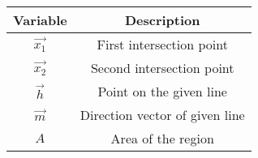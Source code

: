 \begin{tabular}[12pt]{ |c|c|}
    \hline
    \textbf{Variable} & \textbf{Description}\\ 
    \hline
    $\vec{x_1}$ & First intersection point\\
    \hline
    $\vec{x_2}$ & Second intersection point\\
    \hline
    $\vec{h}$ & Point on the given line\\
    \hline
    $\vec{m}$ & Direction vector of given line\\
    \hline
    $A$ & Area of the region\\
    \hline
    \end{tabular}
